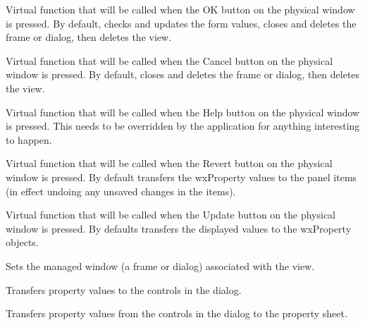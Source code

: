 
Virtual function that will be called when the OK button on the physical window is pressed.
By default, checks and updates the form values, closes and deletes the frame or dialog, then deletes the view.

\label{wxpropertyformviewoncancel}


Virtual function that will be called when the Cancel button on the physical window is pressed.
By default, closes and deletes the frame or dialog, then deletes the view.

\label{wxpropertyformviewonhelp}


Virtual function that will be called when the Help button on the physical window is pressed.
This needs to be overridden by the application for anything interesting to happen.

\label{wxpropertyformviewonrevert}


Virtual function that will be called when the Revert button on the physical window is pressed.
By default transfers the wxProperty values to the panel items (in effect
undoing any unsaved changes in the items).

\label{wxpropertyformviewonupdate}


Virtual function that will be called when the Update button on the physical window is pressed.
By defaults transfers the displayed values to the wxProperty objects.

\label{wxpropertyformviewsetmanagedwindow}


Sets the managed window (a frame or dialog) associated with the view.

\label{wxpropertyformviewtransfertodialog}


Transfers property values to the controls in the dialog.

\label{wxpropertyformviewtransfertopropertysheet}


Transfers property values from the controls in the dialog to the property sheet.


